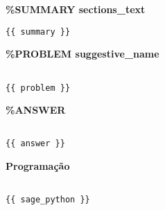



\noindent\textbf{\%SUMMARY {{ sections_text }} }

\begin{verbatim}
{{ summary }}
\end{verbatim}

\noindent\textbf{\%PROBLEM {{ suggestive_name }} }

\begin{verbatim}

{{ problem }}

\end{verbatim}

\noindent\textbf{\%ANSWER}

\begin{verbatim}

{{ answer }}

\end{verbatim}


\noindent\textbf{Programação}

\begin{verbatim}

{{ sage_python }}

\end{verbatim}



